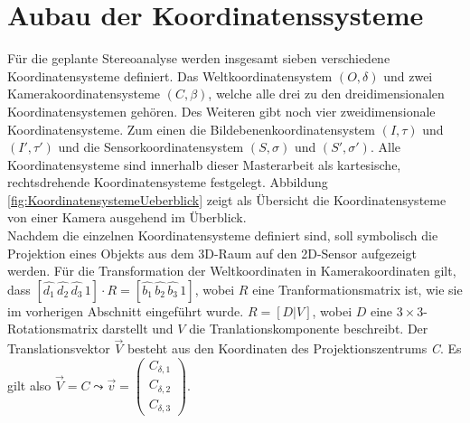 \section{Aubau der Koordinatenssysteme}

		
Für die geplante Stereoanalyse werden insgesamt sieben verschiedene Koordinatensysteme definiert. Das Weltkoordinatensystem $(O,\delta)$ und zwei Kamerakoordinatensysteme $(C,\beta)$, welche alle drei zu den dreidimensionalen Koordinatensystemen gehören. Des Weiteren gibt noch vier zweidimensionale Koordinatensysteme. Zum einen die Bildebenenkoordinatensystem $(I,\tau)$ und $(I',\tau')$ und die Sensorkoordinatensystem $(S,\sigma)$ und $(S',\sigma')$. Alle Koordinatensysteme sind innerhalb dieser Masterarbeit als kartesische, rechtsdrehende Koordinatensysteme festgelegt. Abbildung \ref{fig:KoordinatensystemeUeberblick} zeigt als Übersicht die Koordinatensysteme von einer Kamera ausgehend im Überblick. \\


%


Nachdem die einzelnen Koordinatensysteme definiert sind, soll symbolisch die Projektion eines Objekts  aus dem 3D-Raum auf den 2D-Sensor aufgezeigt werden. Für die Transformation der Weltkoordinaten in Kamerakoordinaten gilt, dass $[\hat{d_1}\,\hat{d_2}\,\hat{d_3}\,1] \cdot R = [\hat{b_1}\,\hat{b_2}\, \hat{b_3}\, 1]$, wobei $R$ eine Tranformationsmatrix ist, wie sie im vorherigen Abschnitt eingeführt wurde. $R=[D|V]$, wobei $D$ eine $3 \times 3$-Rotationsmatrix darstellt und $V$ die Tranlationskomponente beschreibt. Der Translationsvektor \ensuremath{\vec{V}} besteht aus den Koordinaten des Projektionszentrums \textit{C}. Es gilt also $\vec{V} = C \leadsto \vec{v} = \begin{pmatrix}	C_{\delta,1}\\C_{\delta,2}\\C_{\delta,3}\end{pmatrix}$. 


